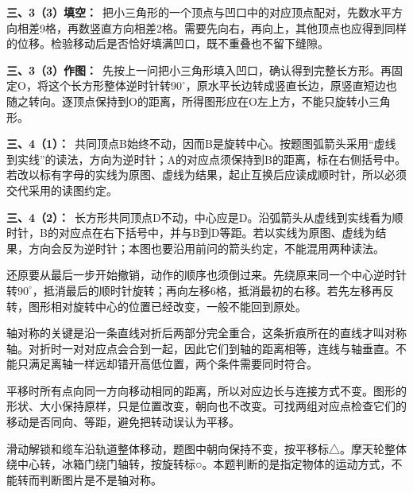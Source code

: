 \documentclass[multi=snippet,border=0pt]{standalone}
\newenvironment{snippet}[3]{\begin{minipage}{#1bp}\color{answerred}\fontsize{#2}{#3}\selectfont\raggedright}{\end{minipage}}
\begin{document}
\begin{snippet}{505}{11.5}{14}\textbf{三、3（3）填空：}\ 把小三角形的一个顶点与凹口中的对应顶点配对，先数水平方向相差9格，再数竖直方向相差2格。需要先向右，再向上，其他顶点也应得到同样的位移。检验移动后是否恰好填满凹口，既不重叠也不留下缝隙。\end{snippet}
\begin{snippet}{505}{11.5}{14}\textbf{三、3（3）作图：}\ 先按上一问把小三角形填入凹口，确认得到完整长方形。再固定O，将这个长方形整体逆时针转\(90^\circ\)，原水平长边转成竖直长边，原竖直短边也随之转向。逐顶点保持到O的距离，所得图形应在O左上方，不能只旋转小三角形。\end{snippet}
\begin{snippet}{505}{11.5}{14}\textbf{三、4（1）：}\ 共同顶点B始终不动，因而B是旋转中心。按题图弧箭头采用“虚线到实线”的读法，方向为逆时针；A的对应点须保持到B的距离，标在右侧括号中。若改以标有字母的实线为原图、虚线为结果，起止互换后应读成顺时针，所以必须交代采用的读图约定。\end{snippet}
\begin{snippet}{505}{11.5}{14}\textbf{三、4（2）：}\ 长方形共同顶点D不动，中心应是D。沿弧箭头从虚线到实线看为顺时针，B的对应点在右下括号中，并与B到D等距。若以实线为原图、虚线为结果，方向会反为逆时针；本图也要沿用前问的箭头约定，不能混用两种读法。\end{snippet}
\begin{snippet}{505}{11.5}{14}还原要从最后一步开始撤销，动作的顺序也须倒过来。先绕原来同一个中心逆时针转\(90^\circ\)，抵消最后的顺时针旋转；再向左移6格，抵消最初的右移。若先左移再反转，图形相对旋转中心的位置已经改变，一般不能回到原处。\end{snippet}
\begin{snippet}{505}{11.5}{14}轴对称的关键是沿一条直线对折后两部分完全重合，这条折痕所在的直线才叫对称轴。对折时一对对应点会合到一起，因此它们到轴的距离相等，连线与轴垂直。不能只满足离轴一样远却错开高低位置，两个条件需要同时符合。\end{snippet}
\begin{snippet}{505}{11.5}{14}平移时所有点向同一方向移动相同的距离，所以对应边长与连接方式不变。图形的形状、大小保持原样，只是位置改变，朝向也不改变。可找两组对应点检查它们的移动是否同向、等距，避免把转动误认为平移。\end{snippet}
\begin{snippet}{505}{11.5}{14}滑动解锁和缆车沿轨道整体移动，题图中朝向保持不变，按平移标△。摩天轮整体绕中心转，冰箱门绕门轴转，按旋转标○。本题判断的是指定物体的运动方式，不能转而判断图片是不是轴对称。\end{snippet}
\end{document}
